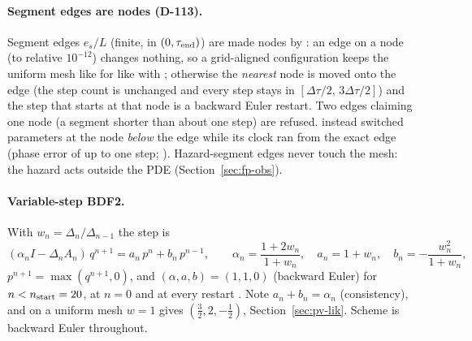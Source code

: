 \paragraph{Segment edges are nodes (D-113).} Segment edges $e_s/L$ (finite, in $(0,\tau_{\rm end})$) are made
nodes by : an edge on a node (to relative $10^{-12}$) changes nothing, so a
grid-aligned configuration keeps the uniform mesh like for like with ; otherwise the
\emph{nearest} node is moved onto the edge (the step count is unchanged and every step stays in
$[\Delta\tau/2,\,3\Delta\tau/2]$) and the step that starts at that node is a backward Euler restart. Two edges
claiming one node (a segment shorter than about one step) are refused.  instead switched
parameters at the node \emph{below} the edge while its clock ran from the exact edge (phase error of up to one
step; ). Hazard-segment edges never touch the mesh: the hazard acts outside
the PDE (Section~\ref{sec:fp-obs}).

\paragraph{Variable-step BDF2.} With $w_n=\Delta_n/\Delta_{n-1}$ the step is
\begin{equation}
  (\alpha_nI-\Delta_nA_n)\,q^{n+1}=a_n\,p^n+b_n\,p^{n-1},\qquad
  \alpha_n=\frac{1+2w_n}{1+w_n},\quad a_n=1+w_n,\quad b_n=-\frac{w_n^2}{1+w_n},
  \label{eq:fp-bdf2}
\end{equation}
$p^{n+1}=\max(q^{n+1},0)$, and $(\alpha,a,b)=(1,1,0)$ (backward Euler) for $n<n_{\rm start}=20$, at $n=0$ and at
every restart . Note $a_n+b_n=\alpha_n$ (consistency), and on a uniform
mesh $w=1$ gives $(\tfrac32,2,-\tfrac12)$, Section~\ref{sec:pv-lik}. Scheme  is backward Euler throughout.

